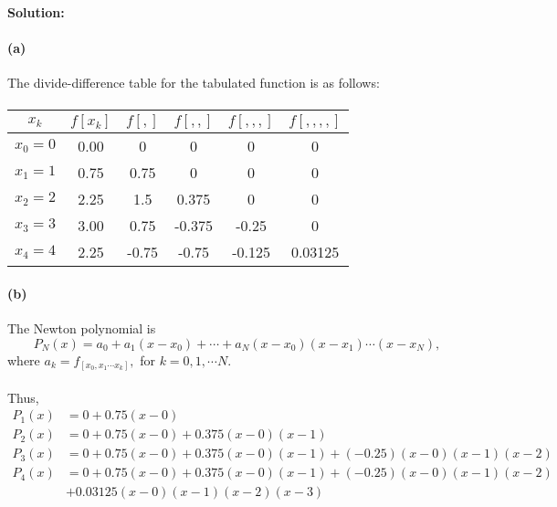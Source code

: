 \documentclass{article}  %
\begin{document}
        \paragraph{Solution:}
        \paragraph{(a)}The divide-difference table for the tabulated function is as follows:
        \paragraph{}
        \renewcommand\tabcolsep{12.0pt} %
            \begin{threeparttable} %
                \begin{tabular}{c|c|c|c|c|c} 
              \hline
              $x_k$ & $f[x_k]$ & $f[ , ]$  & $f[ , , ]$ & $f[ , , , ]$ & $f[ , , , , ]$ \\
              \hline
              $x_0 = 0$ & 0.00 & 0 & 0 & 0 & 0\\
              \cline{2-2}
              $x_1 = 1$ & 0.75 & 0.75 & 0 & 0 & 0\\
              \cline{2-3}
              $x_2 = 2$ & 2.25 & 1.5 & 0.375 & 0 & 0\\
              \cline{2-4}
              $x_3 = 3$ & 3.00 & 0.75 & -0.375 & -0.25 & 0\\
              \cline{2-5}
              $x_4 = 4$ & 2.25 & -0.75 & -0.75 & -0.125 & 0.03125\\
              \hline
            \end{tabular} 
          \end{threeparttable}
        \paragraph{(b)}The Newton polynomial is
        $$P_N(x) = a_0 + a_1(x - x_0) + \cdots + a_N(x - x_0)(x - x_1)\cdots(x - x_N),$$
        where $a_k = f_[x_0, x_1 \cdots x_k],$ for $k = 0, 1, \cdots N$.
        \paragraph{}Thus, 
        \begin{align*}
          P_1(x) &= 0 + 0.75(x - 0) \\
          P_2(x) &= 0 + 0.75(x - 0) + 0.375(x - 0)(x - 1) \\
          P_3(x) &= 0 + 0.75(x - 0) + 0.375(x - 0)(x - 1) + (-0.25)(x - 0)(x - 1)(x - 2) \\
          P_4(x) &= 0 + 0.75(x - 0) + 0.375(x - 0)(x - 1) + (-0.25)(x - 0)(x - 1)(x - 2) \\
          &+0.03125(x - 0)(x - 1)(x - 2)(x - 3)
        \end{align*}
\end{document}
